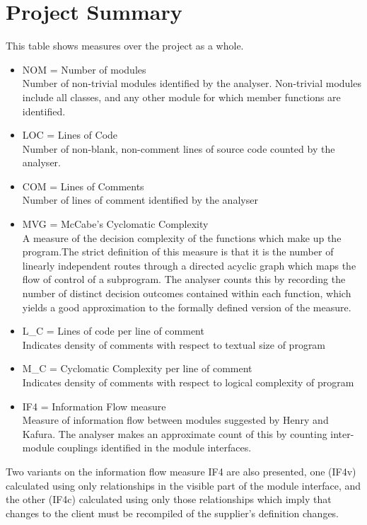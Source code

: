 \section{Project Summary}
 This table shows measures over the project as a whole. \begin{itemize}
\item NOM = Number of modules\\ 
 Number of non-trivial modules identified by the analyser. Non-trivial modules include all classes, and any other module for which member
functions are 
identified. 
\item LOC = Lines of Code\\ 
 Number of non-blank, non-comment lines of source code counted by the analyser. 
\item COM = Lines of Comments\\ 
 Number of lines of comment identified by the analyser 
\item MVG = McCabe's Cyclomatic Complexity\\ 
 A measure of the decision complexity of the functions which make up the program.The strict definition of this measure is that it is the
number of linearly 
independent routes through a directed acyclic graph which maps the flow of control of a subprogram. The analyser counts this by recording
the number of distinct 
decision outcomes contained within each function, which yields a good approximation to the formally defined version of the measure. 
\item L\_C = Lines of code per line of comment\\ 
 Indicates density of comments with respect to textual size of program 
\item M\_C = Cyclomatic Complexity per line of comment\\ 
 Indicates density of comments with respect to logical complexity of program 
\item IF4 = Information Flow measure\\ 
 Measure of information flow between modules suggested by Henry and Kafura. The analyser makes an approximate count of this by counting
inter-module couplings 
identified in the module interfaces. 

\end{itemize}
 Two variants on the information flow measure IF4 are also presented, one (IF4v) calculated using only relationships in the visible part of
the module 
interface, and the other (IF4c) calculated using only those relationships which imply that changes to the client must be recompiled of the
supplier's definition 
changes. 

